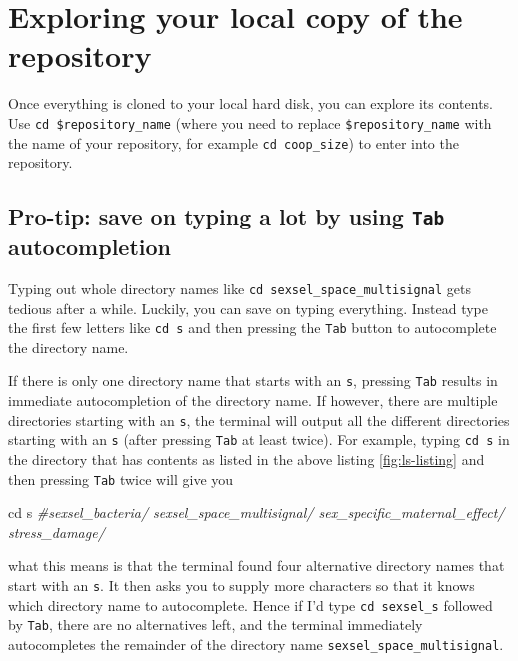 \documentclass[
]{book}
\newenvironment{Shaded}{\begin{snugshade}}{\end{snugshade}}
\newcommand{\BuiltInTok}[1]{#1}
\newcommand{\CommentTok}[1]{\textcolor[rgb]{0.56,0.35,0.01}{\textit{#1}}}
\newcommand{\NormalTok}[1]{#1}
\begin{document}
\hypertarget{exploring-your-local-copy-of-the-repository}{%
\section{Exploring your local copy of the repository}\label{exploring-your-local-copy-of-the-repository}}

Once everything is cloned to your local hard disk, you can explore its contents. Use \texttt{cd\ \$repository\_name} (where you need to replace \texttt{\$repository\_name} with the name of your repository, for example \texttt{cd\ coop\_size}) to enter into the repository.

\hypertarget{pro-tip-save-on-typing-a-lot-by-using-tab-autocompletion}{%
\subsection{\texorpdfstring{Pro-tip: save on typing a lot by using \texttt{Tab} autocompletion}{Pro-tip: save on typing a lot by using Tab autocompletion}}\label{pro-tip-save-on-typing-a-lot-by-using-tab-autocompletion}}

Typing out whole directory names like \texttt{cd\ sexsel\_space\_multisignal} gets tedious after a while. Luckily, you can save on typing everything. Instead type the first few letters like \texttt{cd\ s} and then pressing the \texttt{Tab} button to autocomplete the directory name.

If there is only one directory name that starts with an \texttt{s}, pressing \texttt{Tab} results in immediate autocompletion of the directory name. If however, there are multiple directories starting with an \texttt{s}, the terminal will output all the different directories starting with an \texttt{s} (after pressing \texttt{Tab} at least twice). For example, typing \texttt{cd\ s} in the directory that has contents as listed in the above listing \ref{fig:ls-listing} and then pressing \texttt{Tab} twice will give you

\begin{Shaded}
\begin{Highlighting}[]
\BuiltInTok{cd}\NormalTok{ s}
\CommentTok{\#sexsel\_bacteria/              sexsel\_space\_multisignal/     sex\_specific\_maternal\_effect/ stress\_damage/     }
\end{Highlighting}
\end{Shaded}

what this means is that the terminal found four alternative directory names that start with an \texttt{s}. It then asks you to supply more characters so that it knows which directory name to autocomplete. Hence if I'd type \texttt{cd\ sexsel\_s} followed by \texttt{Tab}, there are no alternatives left, and the terminal immediately autocompletes the remainder of the directory name \texttt{sexsel\_space\_multisignal}.
\end{document}
